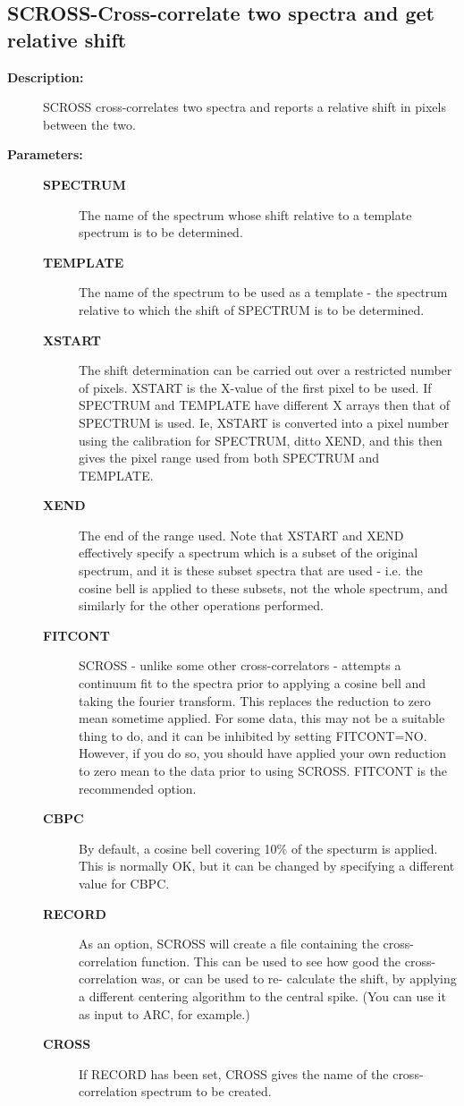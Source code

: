 \subsection{SCROSS-\label{SCROSS}Cross-correlate two spectra and get relative shift}
\begin{description}

\item [\textbf{Description:}]
 SCROSS cross-correlates two spectra and reports a relative shift
 in pixels between the two.

\item [\textbf{Parameters:}]
\begin{description}
\item [\textbf{SPECTRUM}]
 The name of the spectrum whose shift relative
 to a template spectrum is to be determined.
\item [\textbf{TEMPLATE}]
 The name of the spectrum to be used as a
 template - the spectrum relative to which the shift of
 SPECTRUM is to be determined.
\item [\textbf{XSTART}]
 The shift determination can be carried out over a restricted
 number of pixels.  XSTART is the X-value of the first pixel
 to be used.  If SPECTRUM and TEMPLATE have different X arrays
 then that of SPECTRUM is used.  Ie, XSTART is converted into
 a pixel number using the calibration for SPECTRUM, ditto
 XEND, and this then gives the pixel range used from both
 SPECTRUM and TEMPLATE.
\item [\textbf{XEND}]
 The end of the range used.  Note
 that XSTART and XEND effectively specify a spectrum which
 is a subset of the original spectrum, and it is these
 subset spectra that are used - i.e. the cosine bell is
 applied to these subsets, not the whole spectrum, and
 similarly for the other operations performed.
\item [\textbf{FITCONT}]
 SCROSS - unlike some other cross-correlators - attempts a
 continuum fit to the spectra prior to applying a cosine
 bell and taking the fourier transform.  This replaces the
 reduction to zero mean sometime applied.  For some data,
 this may not be a suitable thing to do, and it can be
 inhibited by setting FITCONT=NO.  However, if you do
 so, you should have applied your own reduction to zero
 mean to the data prior to using SCROSS.  FITCONT is the
 recommended option.
\item [\textbf{CBPC}]
 By default, a cosine bell covering 10\% of the specturm is
 applied.  This is normally OK, but it can be changed by
 specifying a different value for CBPC.
\item [\textbf{RECORD}]
 As an option, SCROSS will create a file containing the
 cross-correlation function.  This can be used to see how
 good the cross-correlation was, or can be used to re-
 calculate the shift, by applying a different centering
 algorithm to the central spike.  (You can use it as
 input to ARC, for example.)
\item [\textbf{CROSS}]
 If RECORD has been set, CROSS gives the name of the
 cross-correlation spectrum to be created.
\end{description}


\end{description}
